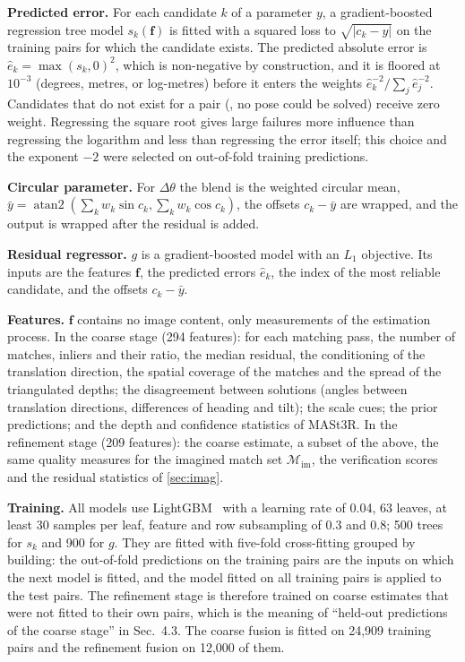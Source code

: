 \documentclass[10pt,twocolumn,letterpaper]{article}
\newcommand{\dth}{\Delta\theta}
\begin{document}
\noindent\textbf{Predicted error.} For each candidate $k$ of a parameter $y$, a gradient-boosted regression tree model $s_k(\mathbf{f})$ is fitted with a squared loss to $\sqrt{|c_k-y|}$ on the training pairs for which the candidate exists. The predicted absolute error is $\hat e_k=\max(s_k,0)^2$, which is non-negative by construction, and it is floored at $10^{-3}$ (degrees, metres, or log-metres) before it enters the weights $\hat e_k^{-2}/\sum_j\hat e_j^{-2}$. Candidates that do not exist for a pair (\eg, no pose could be solved) receive zero weight. Regressing the square root gives large failures more influence than regressing the logarithm and less than regressing the error itself; this choice and the exponent $-2$ were selected on out-of-fold training predictions.

\noindent\textbf{Circular parameter.} For $\dth$ the blend is the weighted circular mean, $\bar y=\operatorname{atan2}(\sum_k w_k\sin c_k,\sum_k w_k\cos c_k)$, the offsets $c_k-\bar y$ are wrapped, and the output is wrapped after the residual is added.

\noindent\textbf{Residual regressor.} $g$ is a gradient-boosted model with an $L_1$ objective. Its inputs are the features $\mathbf{f}$, the predicted errors $\hat e_k$, the index of the most reliable candidate, and the offsets $c_k-\bar y$.

\noindent\textbf{Features.} $\mathbf{f}$ contains no image content, only measurements of the estimation process. In the coarse stage (294 features): for each matching pass, the number of matches, inliers and their ratio, the median residual, the conditioning of the translation direction, the spatial coverage of the matches and the spread of the triangulated depths; the disagreement between solutions (angles between translation directions, differences of heading and tilt); the scale cues; the prior predictions; and the depth and confidence statistics of MASt3R. In the refinement stage (209 features): the coarse estimate, a subset of the above, the same quality measures for the imagined match set $\mathcal{M}_{\mathrm{im}}$, the verification scores and the residual statistics of \cref{sec:imag}.

\noindent\textbf{Training.} All models use LightGBM~\cite{ke2017lightgbm} with a learning rate of 0.04, 63 leaves, at least 30 samples per leaf, feature and row subsampling of 0.3 and 0.8; 500 trees for $s_k$ and 900 for $g$. They are fitted with five-fold cross-fitting grouped by building: the out-of-fold predictions on the training pairs are the inputs on which the next model is fitted, and the model fitted on all training pairs is applied to the test pairs. The refinement stage is therefore trained on coarse estimates that were not fitted to their own pairs, which is the meaning of ``held-out predictions of the coarse stage'' in Sec.~4.3. The coarse fusion is fitted on 24{,}909 training pairs and the refinement fusion on 12{,}000 of them.
\end{document}
